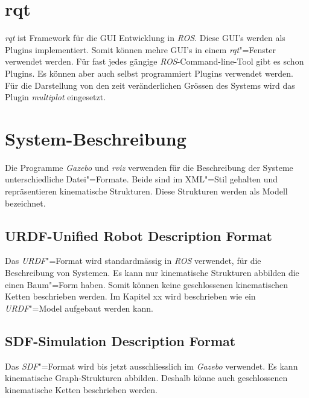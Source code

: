 \section{rqt}
\textit{rqt} ist Framework für die GUI Entwicklung in \textit{ROS}.
Diese GUI's werden als Plugins implementiert.
Somit können mehre GUI's in einem \textit{rqt}"=Fenster verwendet werden.
Für fast jedes gängige \textit{ROS}-Command-line-Tool gibt es schon Plugins. %
Es können aber auch selbst programmiert Plugins verwendet werden. 
Für die Darstellung von den zeit veränderlichen Grössen des Systems wird das Plugin \textit{multiplot} eingesetzt. %



\section{System-Beschreibung} %

Die Programme \textit{Gazebo} und \textit{rviz} verwenden für die Beschreibung der Systeme unterschiedliche Datei"=Formate.
Beide sind im XML"=Stil gehalten und repräsentieren kinematische Strukturen.
Diese Strukturen werden als Modell bezeichnet.

\subsection{URDF-Unified Robot Description Format}
Das \textit{URDF}"=Format wird standardmässig in \textit{ROS} verwendet, für die Beschreibung von Systemen.
Es kann nur kinematische Strukturen abbilden die einen Baum"=Form haben.
Somit können keine geschlossenen kinematischen Ketten beschrieben werden.
Im Kapitel xx wird beschrieben wie ein \textit{URDF}"=Model aufgebaut werden kann. %

\subsection{SDF-Simulation Description Format}
Das \textit{SDF}"=Format wird bis jetzt ausschliesslich im \textit{Gazebo} verwendet.
Es kann kinematische Graph-Strukturen abbilden.
Deshalb könne auch geschlossenen kinematische Ketten beschrieben werden.

